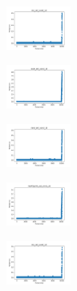\begin{figure}[H]
\begin{subfigure}
    \end{subfigure}
    \hfill
    \begin{subfigure}
        \centering
        \includegraphics[width=0.234\textwidth]{img/HS-LS-v2/iris_set_const_10_589741062_time.png}
    \end{subfigure}
    \hfill
    \begin{subfigure}
        \centering
        \includegraphics[width=0.234\textwidth]{img/HS-LS-v2/ecoli_set_const_10_589741062_time.png}
    \end{subfigure}
    \hfill
    \begin{subfigure}
        \centering
        \includegraphics[width=0.234\textwidth]{img/HS-LS-v2/rand_set_const_10_589741062_time.png}
    \end{subfigure}
    \hfill
    \begin{subfigure}
        \centering
        \includegraphics[width=0.234\textwidth]{img/HS-LS-v2/newthyroid_set_const_10_589741062_time.png}
    \end{subfigure}
    \hfill
    \begin{subfigure}
        \centering
        \includegraphics[width=0.234\textwidth]{img/HS-LS-v2/iris_set_const_10_277451237_time.png}
    \end{subfigure}

\end{figure}
